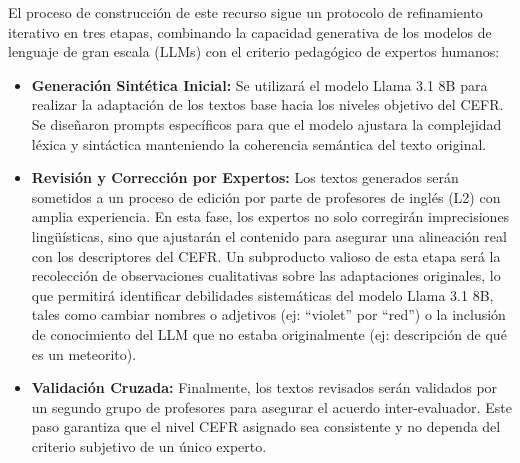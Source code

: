 El proceso de construcción de este recurso sigue un protocolo de refinamiento iterativo en tres etapas, combinando la capacidad generativa de los modelos de lenguaje de gran escala (LLMs) con el criterio pedagógico de expertos humanos:

\begin{itemize}
    \item \textbf{Generación Sintética Inicial:} Se utilizará el modelo Llama 3.1 8B para realizar la adaptación de los textos base hacia los niveles objetivo del CEFR. Se diseñaron prompts específicos para que el modelo ajustara la complejidad léxica y sintáctica manteniendo la coherencia semántica del texto original.

    \item \textbf{Revisión y Corrección por Expertos:} Los textos generados serán sometidos a un proceso de edición por parte de profesores de inglés (L2) con amplia experiencia. En esta fase, los expertos no solo corregirán imprecisiones lingüísticas, sino que ajustarán el contenido para asegurar una alineación real con los descriptores del CEFR. Un subproducto valioso de esta etapa será la recolección de observaciones cualitativas sobre las adaptaciones originales, lo que permitirá identificar debilidades sistemáticas del modelo Llama 3.1 8B, tales como cambiar nombres o adjetivos (ej: ``violet'' por ``red'') o la inclusión de conocimiento del LLM que no estaba originalmente (ej: descripción de qué es un meteorito).

    \item \textbf{Validación Cruzada:} Finalmente, los textos revisados serán validados por un segundo grupo de profesores para asegurar el acuerdo inter-evaluador. Este paso garantiza que el nivel CEFR asignado sea consistente y no dependa del criterio subjetivo de un único experto.
\end{itemize}
